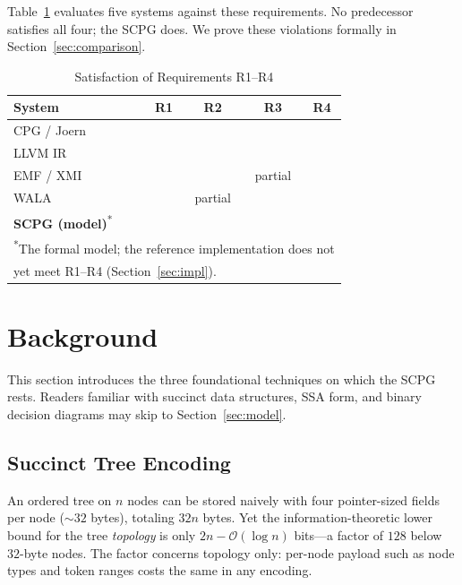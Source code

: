 \documentclass[journal,10pt,twoside]{IEEEtran}
\newcommand{\cmark}{\ding{51}}
\newcommand{\xmark}{\ding{55}}
\newcommand{\BigO}{\mathcal{O}}
\begin{document}
Table~\ref{tab:compare} evaluates five systems against these
requirements.  No predecessor satisfies all four; the SCPG
does.  We prove these violations formally in
Section~\ref{sec:comparison}.

\begin{table}[!t]
\renewcommand{\arraystretch}{1.3}
\caption{Satisfaction of Requirements R1--R4}
\label{tab:compare}
\centering
\small
\begin{tabular}{@{}lcccc@{}}
\toprule
\textbf{System} & \textbf{R1} & \textbf{R2} &
  \textbf{R3} & \textbf{R4}\\
\midrule
CPG / Joern~\cite{yamaguchi14}  & \xmark & \xmark & \xmark & \cmark\\
LLVM IR~\cite{lattner04}         & \cmark & \xmark & \xmark & \cmark\\
EMF / XMI~\cite{emf}             & \xmark & \xmark & partial & \xmark\\
WALA~\cite{wala}                 & \xmark & partial & \xmark & \cmark\\
\textbf{SCPG (model)}\textsuperscript{*} & \cmark & \cmark & \cmark & \cmark\\
\bottomrule
\multicolumn{5}{l}{\scriptsize\textsuperscript{*}The formal model; the reference
  implementation does not}\\
\multicolumn{5}{l}{\scriptsize yet meet R1--R4 (Section~\ref{sec:impl}).}
\end{tabular}
\end{table}

\section{Background}\label{sec:background}

This section introduces the three foundational techniques
on which the SCPG rests.  Readers familiar with succinct data
structures, SSA form, and binary decision diagrams may skip
to Section~\ref{sec:model}.

\subsection{Succinct Tree Encoding}

An ordered tree on $n$ nodes can be stored naively with four
pointer-sized fields per node ($\sim 32$ bytes), totaling
$32n$ bytes.  Yet the information-theoretic lower bound for
the tree \emph{topology} is only $2n - \BigO(\log n)$
bits---a factor of $128$ below $32$-byte nodes.  The factor
concerns topology only: per-node payload such as node types
and token ranges costs the same in any encoding.
\end{document}
